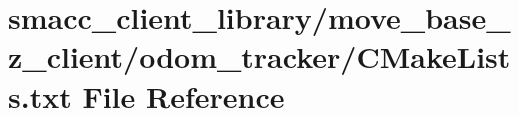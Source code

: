 \hypertarget{client__library_2move__base__z__client_2odom__tracker_2CMakeLists_8txt}{}\section{smacc\+\_\+client\+\_\+library/move\+\_\+base\+\_\+z\+\_\+client/odom\+\_\+tracker/\+C\+Make\+Lists.txt File Reference}
\label{client__library_2move__base__z__client_2odom__tracker_2CMakeLists_8txt}
